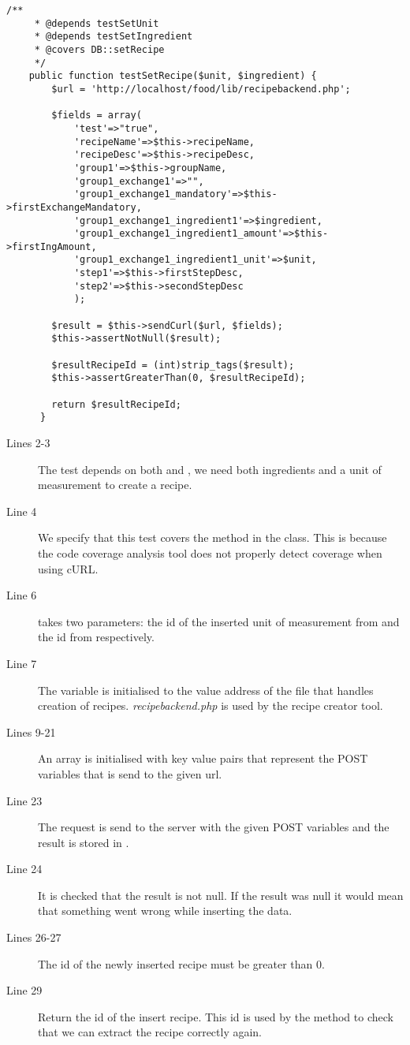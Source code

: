 \begin{lstlisting}[language=phpstyle]
    /**
     * @depends testSetUnit
     * @depends testSetIngredient
     * @covers DB::setRecipe
     */
    public function testSetRecipe($unit, $ingredient) {
        $url = 'http://localhost/food/lib/recipebackend.php';

        $fields = array(
            'test'=>"true",
            'recipeName'=>$this->recipeName,
            'recipeDesc'=>$this->recipeDesc,
            'group1'=>$this->groupName,
            'group1_exchange1'=>"",
            'group1_exchange1_mandatory'=>$this->firstExchangeMandatory,
            'group1_exchange1_ingredient1'=>$ingredient,
            'group1_exchange1_ingredient1_amount'=>$this->firstIngAmount,
            'group1_exchange1_ingredient1_unit'=>$unit,
            'step1'=>$this->firstStepDesc,
            'step2'=>$this->secondStepDesc
            );
        
        $result = $this->sendCurl($url, $fields);
        $this->assertNotNull($result);
            
        $resultRecipeId = (int)strip_tags($result);
        $this->assertGreaterThan(0, $resultRecipeId);
        
        return $resultRecipeId;
      }
\end{lstlisting}

\begin{description}
\item[Lines 2-3] The test depends on both  and , we need both ingredients and a unit of measurement to create a recipe.
\item[Line 4] We specify that this test covers the  method in the  class. This is because the code coverage analysis tool does not properly detect coverage when using cURL\cite{curl}.
\item[Line 6]  takes two parameters: the id of the inserted unit of measurement from  and the id from  respectively.
\item[Line 7] The  variable is initialised to the value address of the file that handles creation of recipes. \textit{recipebackend.php} is used by the recipe creator tool.%
\item[Lines 9-21] An array is initialised with key value pairs that represent the POST variables that is send to the given url.
\item[Line 23] The request is send to the server with the given POST variables and the result is stored in .%
\item[Line 24] It is checked that the result is not null. If the result was null it would mean that something went wrong while inserting the data.
\item[Lines 26-27] The id of the newly inserted recipe must be greater than 0.
\item[Line 29] Return the id of the insert recipe. This id is used by the  method to check that we can extract the recipe correctly again.
\end{description}

